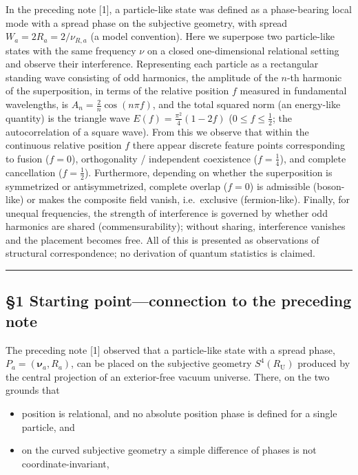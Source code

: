 \documentclass[
]{article}
\providecommand{\tightlist}{%
  \setlength{\itemsep}{0pt}\setlength{\parskip}{0pt}}
\begin{document}
In the preceding note {[}1{]}, a particle-like state was defined as a
phase-bearing local mode with a spread phase on the subjective geometry,
with spread \(W_a=2R_a=2/\nu_{R,a}\) (a model convention). Here we
superpose two particle-like states with the same frequency \(\nu\) on a
closed one-dimensional relational setting and observe their
interference. Representing each particle as a rectangular standing wave
consisting of odd harmonics, the amplitude of the \(n\)-th harmonic of
the superposition, in terms of the relative position \(f\) measured in
fundamental wavelengths, is \(A_n=\tfrac{2}{n}\cos(n\pi f)\), and the
total squared norm (an energy-like quantity) is the triangle wave
\(E(f)=\tfrac{\pi^2}{4}(1-2f)\) (\(0\le f\le\tfrac12\); the
autocorrelation of a square wave). From this we observe that within the
continuous relative position \(f\) there appear discrete feature points
corresponding to fusion (\(f=0\)), orthogonality / independent
coexistence (\(f=\tfrac14\)), and complete cancellation
(\(f=\tfrac12\)). Furthermore, depending on whether the superposition is
symmetrized or antisymmetrized, complete overlap (\(f=0\)) is admissible
(boson-like) or makes the composite field vanish, i.e.~exclusive
(fermion-like). Finally, for unequal frequencies, the strength of
interference is governed by whether odd harmonics are shared
(commensurability); without sharing, interference vanishes and the
placement becomes free. All of this is presented as observations of
structural correspondence; no derivation of quantum statistics is
claimed.

\begin{center}\rule{0.5\linewidth}{0.5pt}\end{center}

\subsection{§1 Starting point---connection to the preceding
note}\label{starting-pointconnection-to-the-preceding-note}

The preceding note {[}1{]} observed that a particle-like state with a
spread phase, \(P_a=(\boldsymbol{\nu}_a,R_a)\), can be placed on the
subjective geometry \(S^4(R_{\mathrm U})\) produced by the central
projection of an exterior-free vacuum universe. There, on the two
grounds that

\begin{itemize}
\tightlist
\item
  position is relational, and no absolute position phase is defined for
  a single particle, and
\item
  on the curved subjective geometry a simple difference of phases is not
  coordinate-invariant,
\end{itemize}
\end{document}

